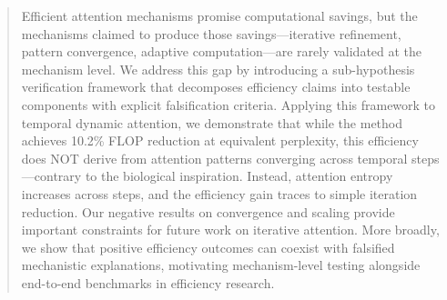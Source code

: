 \begin{abstract}
Efficient attention mechanisms promise computational savings, but the mechanisms claimed to produce those savings---iterative refinement, pattern convergence, adaptive computation---are rarely validated at the mechanism level. We address this gap by introducing a sub-hypothesis verification framework that decomposes efficiency claims into testable components with explicit falsification criteria. Applying this framework to temporal dynamic attention, we demonstrate that while the method achieves 10.2\% FLOP reduction at equivalent perplexity, this efficiency does NOT derive from attention patterns converging across temporal steps---contrary to the biological inspiration. Instead, attention entropy increases across steps, and the efficiency gain traces to simple iteration reduction. Our negative results on convergence and scaling provide important constraints for future work on iterative attention. More broadly, we show that positive efficiency outcomes can coexist with falsified mechanistic explanations, motivating mechanism-level testing alongside end-to-end benchmarks in efficiency research.
\end{abstract}
